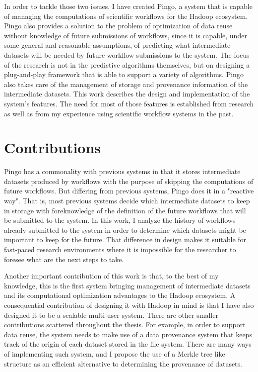 In order to tackle those two issues, I have created Pingo, a system that is capable of managing the computations of scientific workflows for the Hadoop ecosystem. Pingo also provides a solution to the problem of optimization of data reuse without knowledge of future submissions of workflows, since it is capable, under some general and reasonable assumptions, of predicting what intermediate datasets will be needed by future workflow submissions to the system. The focus of the research is not in the predictive algorithms themselves, but on designing a plug-and-play framework that is able to support a variety of algorithms. Pingo also takes care of the management of storage and provenance information of the intermediate datasets. This work describes the design and implementation of the system's features.  The need for most of those features is established from research as well as from my experience using scientific workflow systems in the past. 

\section{Contributions}
Pingo has a commonality with previous systems \citep{altintas2004kepler, yuan2012data, deelman2015pegasus} in that it stores intermediate datasets produced by workflows with the purpose of skipping the computations of future workflows. But differing from previous systems, Pingo does it in a "reactive way".  That is, most previous systems decide which intermediate datasets to keep in storage with foreknowledge of the definition of the future workflows that will be submitted to the system.  In this work, I analyze the history of workflows already submitted to the system in order to determine which datasets might be important to keep for the future. That difference in design makes it suitable for fast-paced research environments where it is impossible for the researcher to foresee what are the next steps to take.

Another important contribution of this work is that, to the best of my knowledge, this is the first system bringing management of intermediate datasets and its computational optimization advantages to the Hadoop ecosystem.  A consequential contribution of designing it with Hadoop in mind is that I have also designed it to be a scalable multi-user system.  There are other smaller contributions scattered throughout the thesis. For example, in order to support data reuse, the system needs to make use of a data provenance system that keeps track of the origin of each dataset stored in the file system. There are many ways of implementing such system, and I propose the use of a Merkle tree like structure as an efficient alternative to determining the provenance of datasets.  

